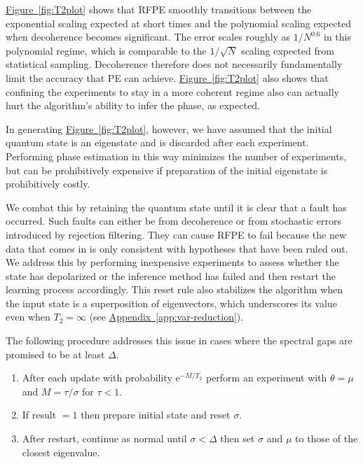 \documentclass[aps,pra,amsmath,twocolumn,amssymb,superscriptaddress]{revtex4-1}
\newcommand{\app}[1]{\hyperref[app:#1]{Appendix~\ref*{app:#1}}}
\newcommand{\fig}[1]{\hyperref[fig:#1]{Figure~\ref*{fig:#1}}}
\newcommand{\ee}{\mathrm{e}}
\begin{document}
\fig{T2plot} shows that RFPE smoothly transitions between the exponential scaling expected at short times and the polynomial scaling expected when decoherence becomes significant.  The error scales roughly as $1/N^{0.6}$ in this polynomial regime, which is comparable to the $1/\sqrt{N}$ scaling expected from statistical sampling.  Decoherence therefore does not necessarily fundamentally limit the accuracy that PE can achieve.  \fig{T2plot} also shows that confining the experiments to stay in a more coherent regime also can actually hurt the algorithm's ability to infer the phase, as expected.


In generating \fig{T2plot}, however, we have assumed that the initial quantum state is an eigenstate and is discarded after each experiment. Performing phase estimation in this way minimizes the number of experiments, but can be prohibitively expensive if preparation of the initial eigenstate is prohibitively costly.  

We combat this by retaining the quantum state until it is clear that
a fault has occurred.  Such faults can either be from decoherence or from stochastic errors introduced by rejection filtering.  They
 can cause RFPE to fail because the new data that comes in is only consistent with hypotheses that have been ruled out.
We address this by performing inexpensive experiments to assess whether the state has depolarized or the inference method has failed
and then restart the learning process accordingly.
This reset rule also stabilizes the algorithm when the input state is a superposition of eigenvectors, which underscores its value
even when $T_2=\infty$ (see \app{var-reduction}).

The following procedure addresses this issue in cases where the spectral gaps are promised to be at least $\Delta$.
\begin{enumerate}
\item After each update with probability $\ee^{-M/T_2}$ perform an experiment with $\theta=\mu$ and $M=\tau/\sigma$ for $\tau< 1$.
\item If result $=1$ then prepare initial state and reset $\sigma$.
\item After restart, continue as normal until $\sigma<\Delta$ then set $\sigma$ and $\mu$ to those of the closest eigenvalue.
\end{enumerate}
\end{document}
